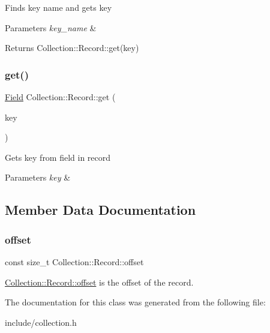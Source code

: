 Finds key name and gets key


\begin{DoxyParams}{Parameters}
{\em key\+\_\+name} & \\
\hline
\end{DoxyParams}
\begin{DoxyReturn}{Returns}
Collection\+::\+Record\+::get(key) 
\end{DoxyReturn}
\mbox{\label{class_collection_1_1_record_a7e977898edd578a4dd198798e77c96c7}} 
\subsubsection{\texorpdfstring{get()}{get()}\hspace{0.1cm}{\footnotesize\ttfamily [2/2]}}
{\footnotesize\ttfamily \hyperlink{struct_field}{Field} Collection\+::\+Record\+::get (\begin{DoxyParamCaption}\item[{\hyperlink{struct_key}{Key}}]{key }\end{DoxyParamCaption})}

Gets key from field in record


\begin{DoxyParams}{Parameters}
{\em key} & \\
\hline
\end{DoxyParams}


\subsection{Member Data Documentation}
\mbox{\label{class_collection_1_1_record_aabb05802a9c94e791df47bd7d8bda096}} 
\subsubsection{\texorpdfstring{offset}{offset}}
{\footnotesize\ttfamily const size\+\_\+t Collection\+::\+Record\+::offset}

\hyperlink{class_collection_1_1_record_aabb05802a9c94e791df47bd7d8bda096}{Collection\+::\+Record\+::offset} is the offset of the record. 

The documentation for this class was generated from the following file\+:\begin{DoxyCompactItemize}
\item 
include/collection.\+h\end{DoxyCompactItemize}
